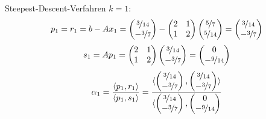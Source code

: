 \begin{example}{Steepest-Descent-Verfahren}
    $k = 1$:
    \[
        p_1 = r_1 = b - Ax_1 =
        \begin{pmatrix}
            \nicefrac{3}{14} \\ -\nicefrac{3}{7}
        \end{pmatrix}
        -
        \begin{pmatrix}
            2 & 1 \\
            1 & 2
        \end{pmatrix}
        \begin{pmatrix}
            \nicefrac{5}{7} \\ \nicefrac{5}{14}
        \end{pmatrix}
        =
        \begin{pmatrix}
            \nicefrac{3}{14} \\ -\nicefrac{3}{7}
        \end{pmatrix}
    \]
    \[
        s_1 = A p_1 =
        \begin{pmatrix}
            2 & 1 \\
            1 & 2
        \end{pmatrix}
        \begin{pmatrix}
            \nicefrac{3}{14} \\ -\nicefrac{3}{7}
        \end{pmatrix}
        =
        \begin{pmatrix}
            0 \\ -\nicefrac{9}{14}
        \end{pmatrix}
    \]
    \[
        \alpha_1 = \frac{\langle p_1, r_1 \rangle}{\langle p_1, s_1 \rangle} = \frac{\langle
            \begin{pmatrix}
                \nicefrac{3}{14} \\ -\nicefrac{3}{7}
            \end{pmatrix},
            \begin{pmatrix}
                \nicefrac{3}{14} \\ -\nicefrac{3}{7}
            \end{pmatrix}
            \rangle}{\langle
            \begin{pmatrix}
                \nicefrac{3}{14} \\ -\nicefrac{3}{7}
            \end{pmatrix},
            \begin{pmatrix}
                0 \\ -\nicefrac{9}{14}
            \end{pmatrix}
}\]
\end{example}
